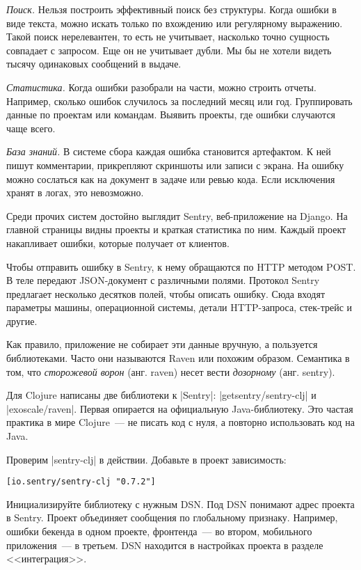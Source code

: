 \emph{Поиск.} Нельзя построить эффективный поиск без структуры. Когда ошибки в
виде текста, можно искать только по вхождению или регулярному выражению. Такой
поиск нерелевантен, то есть не учитывает, насколько точно сущность совпадает с
запросом. Еще он не учитывает дубли. Мы бы не хотели видеть тысячу одинаковых
сообщений в выдаче.

\emph{Статистика.} Когда ошибки разобрали на части, можно строить
отчеты. Например, сколько ошибок случилось за последний месяц или
год. Группировать данные по проектам или командам. Выявить проекты, где ошибки
случаются чаще всего.

\emph{База знаний.} В системе сбора каждая ошибка становится артефактом. К ней
пишут комментарии, прикрепляют скриншоты или записи с экрана. На ошибку можно
сослаться как на документ в задаче или ревью кода. Если исключения хранят в
логах, это невозможно.

Среди прочих систем достойно выглядит Sentry, веб-приложение на Django. На
главной страницы видны проекты и краткая статистика по ним. Каждый проект
накапливает ошибки, которые получает от клиентов.

Чтобы отправить ошибку в Sentry, к нему обращаются по HTTP методом POST. В теле
передают JSON-документ с различными полями. Протокол Sentry предлагает несколько
десятков полей, чтобы описать ошибку. Сюда входят параметры машины, операционной
системы, детали HTTP-запроса, стек-трейс и другие.

Как правило, приложение не собирает эти данные вручную, а пользуется
библиотеками. Часто они называются Raven или похожим образом. Семантика в том,
что \emph{сторожевой ворон} (анг. raven) несет вести \emph{дозорному}
(анг. sentry).

Для Clojure написаны две библиотеки к \spverb|Sentry|:
\spverb|getsentry/sentry-clj| и
\spverb|exoscale/raven|. Первая опирается на
официальную Java-библиотеку. Это частая практика в мире Clojure~--- не писать
код с нуля, а повторно использовать код на Java.

Проверим \spverb|sentry-clj| в действии. Добавьте в проект зависимость:

\begin{verbatim}
[io.sentry/sentry-clj "0.7.2"]
\end{verbatim}

Инициализируйте библиотеку с нужным DSN. Под DSN понимают адрес проекта в
Sentry. Проект объединяет сообщения по глобальному признаку. Например, ошибки
бекенда в одном проекте, фронтенда~--- во втором, мобильного приложения~--- в
третьем. DSN находится в настройках проекта в разделе <<интеграция>>.


